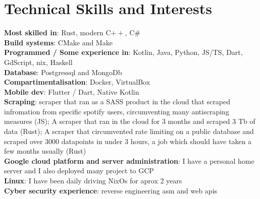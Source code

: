 \documentclass[a4paper,11pt]{article}
\begin{document}
\section{\textbf{Technical Skills and Interests}}
\begin{itemize}[leftmargin=0.05in, label={}]
    \small{\item{
          \textbf{Most skilled in}{: Rust, modern C$++$, C\#} \\
          \textbf{Build systems}{: CMake and Make} \\
          \textbf{Programmed / Some experience in}{: Kotlin, Java, Python, JS/TS, Dart, GdScript, nix, Haskell} \\
          \textbf{Database}{: Postgressql and MongoDb} \\
          \textbf{Compartimentalisation}{: Docker, VirtualBox} \\
          \textbf{Mobile dev}{: Flutter / Dart, Native Kotlin} \\
          \textbf{Scraping}{:  scraper that ran as a SASS product in the cloud that scraped infromation from specific spotify users, circumventing many antiscraping measures (JS); A scraper that ran in the cloud for 3 months and scraped 3 Tb of data (Rust); A scraper that circumvented rate limiting on a public database and scraped over 3000 datapoints in under 3 hours, a job which should have taken a few months usually (Rust) } \\
          \textbf{Google cloud platform and server administration}{: I have a personal home server and I also deployed many project to GCP } \\
          \textbf{Linux}{: I have been daily driving NixOs for aprox 2 years} \\
          \textbf{Cyber security experience}{: reverse engineering asm and web apis} \\
          }}
\end{itemize}
\vspace{-16pt}
\end{document}
